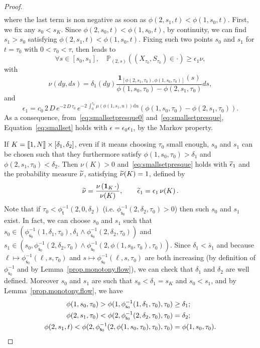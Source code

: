 \documentclass[AHL,Unicode,longabstracts,published]{cedram}
\newcommand{\llbracket}{\mathopen{[\mkern -2.7mu[}}
\newcommand{\rrbracket}{\mathclose{]\mkern -2.7mu]}}
\newcommand{\PP}{\mathbb{P}}
\newcommand{\dif}{\mathrm{d}}
\newcommand{\phit}{\phi_\textsf{t}^{-1}}
\newcommand{\phis}{\phi_{\textsf{s}_0}^{-1}}
\newcommand{\1}{\mathbf{1}}
\let\oldtilde\tilde
\renewcommand*{\tilde}[1]{\mathchoice{\widetilde{#1}}{\widetilde{#1}}{\oldtilde{#1}}{\oldtilde{#1}}}
\let\oldforall\forall
\renewcommand*{\forall}{\mathrel{\oldforall}}
\begin{document}
\begin{proof}
\begin{align*}
\end{align*}
where the last term is non negative as soon as $\phi(2,s_1,t)<\phi(1,s_0,t)$. First, we fix any $s_0<s_K$. Since $\phi(2,s_0,t)<\phi(1,s_0,t)$, by continuity, we can find $ s_1 > s_0$ satisfying $\phi(2,s_1,t)<\phi(1,s_0,t)$. Fixing such two points $s_0$ and $s_1$ for $t=\tau_0$ with $0<\tau_0<\tau$, then leads to
\begin{equation}\label{eq:smallsetpresque}
\forall s\in [s_0,s_1], \quad \PP_{(2,s)}\left((X_{\tau_0},S_{\tau_0})\in \cdot\right) \geq \epsilon_1 \nu,
\end{equation}
with
\[
\nu(dy,ds) =\delta_{1}(dy) \frac{\1_{[\phi(2,s_1,\tau_0),\phi(1,s_0,\tau_0)]} (s)}{\phi(1,s_0,\tau_0) -\phi(2,s_1,\tau_0)} ds,
\]
and
\[
\epsilon_1= c_{0} \, 2\,D \, e^{-2\,D\,\tau_0}\, e^{ - 2\,\int_0^{\tau_0}\mu (\phi(1,s_1,u)) \dif u} (\phi(1,s_0,\tau_0) -\phi(2,s_1,\tau_0)).
\]
As a consequence, from~\eqref{eq:smallsetpresque0} and~\eqref{eq:smallsetpresque}, Equation~\eqref{eq:smallset} holds with $\epsilon=\epsilon_0 \epsilon_1$, by the Markov property.


If $K = \llbracket 1, N \rrbracket \times [\delta_1, \delta_2]$, even if it means choosing $\tau_0$ small enough, $s_0$ and $s_1$ can be chosen such that they furthermore satisfy $\phi(1,s_0,\tau_0)> \delta_1$ and $\phi(2,s_1,\tau_0)< \delta_2$. Then $\nu(K)>0$ and~\eqref{eq:smallsetpresque} holds with $\tilde \epsilon_1$ and the probability measure $\tilde \nu$, satisfying $\tilde \nu(K)=1$, defined by
\[
\tilde \nu = \frac{\nu\left(\1_K\, \cdot \right)}{\nu(K)}, \qquad \tilde \epsilon_1= \epsilon_1\, \nu(K)\,.
\]
Note that if $\tau_0<\phit(2,0,\delta_2)$ (i.e. $\phis(2,\delta_2,\tau_0)>0$) then such $s_0$ and $s_1$ exist. In fact, we can choose $s_0$ and $s_1$ such that $s_0\in (\phis(1,\delta_1,\tau_0), \delta_1\wedge \phis(2,\delta_2,\tau_0))$ and $s_1\in (s_0, \phis(2,\delta_2,\tau_0)\wedge \phis(2,\phi(1,s_0,\tau_0),\tau_0))$. Since $\delta_1<\bar s_1$ and because $\ell\mapsto \phis(\ell,s,\tau_0)$ and $s\mapsto \phis(\ell,s,\tau_0)$ are both increasing (by definition of $\phis$ and by Lemma~\ref{prop.monotony.flow}), we can check that $\delta_1$ and $\delta_2$ are well defined. Moreover $s_0$ and $s_1$ are such that $s_0<\delta_1=s_K $ and $s_0<s_1$, and by Lemma~\ref{prop.monotony.flow}, we have
\begin{align*}
\phi(1,s_0,\tau_0)> \phi(1,\phis(1,\delta_1,\tau_0),\tau_0) &\geq \delta_1;
\\
\phi(2,s_1,\tau_0)<\phi(2, \phis(2,\delta_2,\tau_0), \tau_0) &=\delta_2;
\\
\phi(2,s_1,t)<\phi(2,\phis(2,\phi(1,s_0,\tau_0),\tau_0),\tau_0) &=\phi(1,s_0,\tau_0).\qedhere
\end{align*}
\end{proof}
\end{document}
